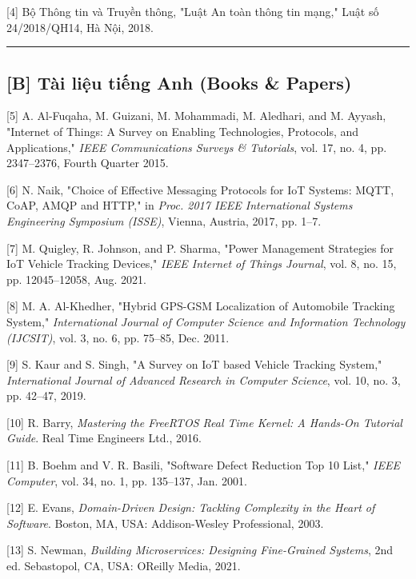 \documentclass[13pt,a4paper]{extarticle}
\renewcommand{\\}{\thesislongtableorignewline\hline}%
\begin{document}
{[}4{]} Bộ Thông tin và Truyền thông, "Luật An toàn thông tin mạng,"
Luật số 24/2018/QH14, Hà Nội, 2018.

\begin{center}\rule{0.5\linewidth}{0.5pt}\end{center}

\subsection{{[}B{]} Tài liệu tiếng Anh (Books \&
Papers)}\label{b-tuxe0i-liux1ec7u-tiux1ebfng-anh-books--papers}

{[}5{]} A. Al-Fuqaha, M. Guizani, M. Mohammadi, M. Aledhari, and M.
Ayyash, "Internet of Things: A Survey on Enabling Technologies,
Protocols, and Applications," \emph{IEEE Communications Surveys \&
Tutorials}, vol. 17, no. 4, pp. 2347--2376, Fourth Quarter 2015.

{[}6{]} N. Naik, "Choice of Effective Messaging Protocols for IoT
Systems: MQTT, CoAP, AMQP and HTTP," in \emph{Proc. 2017 IEEE
International Systems Engineering Symposium (ISSE)}, Vienna, Austria,
2017, pp. 1--7.

{[}7{]} M. Quigley, R. Johnson, and P. Sharma, "Power Management
Strategies for IoT Vehicle Tracking Devices," \emph{IEEE Internet of
Things Journal}, vol. 8, no. 15, pp. 12045--12058, Aug. 2021.

{[}8{]} M. A. Al-Khedher, "Hybrid GPS-GSM Localization of Automobile
Tracking System," \emph{International Journal of Computer Science and
Information Technology (IJCSIT)}, vol. 3, no. 6, pp. 75--85, Dec. 2011.

{[}9{]} S. Kaur and S. Singh, "A Survey on IoT based Vehicle Tracking
System," \emph{International Journal of Advanced Research in Computer
Science}, vol. 10, no. 3, pp. 42--47, 2019.

{[}10{]} R. Barry, \emph{Mastering the FreeRTOS Real Time Kernel: A
Hands-On Tutorial Guide}. Real Time Engineers Ltd., 2016.

{[}11{]} B. Boehm and V. R. Basili, "Software Defect Reduction Top 10
List," \emph{IEEE Computer}, vol. 34, no. 1, pp. 135--137, Jan. 2001.

{[}12{]} E. Evans, \emph{Domain-Driven Design: Tackling Complexity in
the Heart of Software}. Boston, MA, USA: Addison-Wesley Professional,
2003.

{[}13{]} S. Newman, \emph{Building Microservices: Designing Fine-Grained
Systems}, 2nd ed. Sebastopol, CA, USA: O\textquotesingle Reilly Media,
2021.
\end{document}
